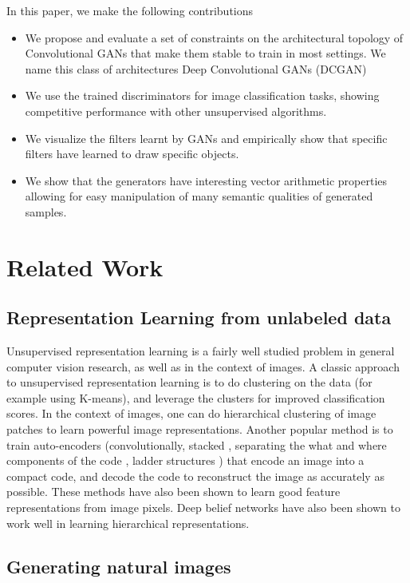 \documentclass{article} %
\begin{document}
In this paper, we make the following contributions
\begin{itemize}  
    \item We propose and evaluate a set of constraints on the architectural topology of Convolutional GANs that make them stable to train in most settings. We name this class of architectures Deep Convolutional GANs (DCGAN)
    \item We use the trained discriminators for image classification tasks, showing competitive performance with other unsupervised algorithms.
    \item We visualize the filters learnt by GANs and empirically show that specific filters have learned to draw specific objects.
    \item We show that the generators have interesting vector arithmetic properties allowing for easy manipulation of many semantic qualities of generated samples.
\end{itemize}

\section{Related Work}
\subsection{Representation Learning from unlabeled data}
Unsupervised representation learning is a fairly well studied problem in general computer vision research, as well as in the context of images. A classic approach to unsupervised representation learning is to do clustering on the data (for example using K-means), and leverage the clusters for improved classification scores. In the context of images, one can do hierarchical clustering of image patches \citep{coates2012learning} to learn powerful image representations. Another popular method is to train auto-encoders (convolutionally, stacked \citep{vincent2010stacked}, separating the what and where components of the code \citep{zhao2015stacked}, ladder structures \citep{rasmus2015semi}) that encode an image into a compact code, and decode the code to reconstruct the image as accurately as possible. These methods have also been shown to learn good feature representations from image pixels. Deep belief networks \citep{lee2009convolutional} have also been shown to work well in learning hierarchical representations.

\subsection{Generating natural images}
\end{document}
